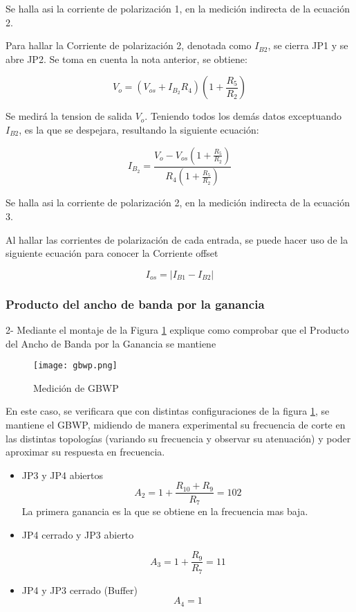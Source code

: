  Se halla asi la corriente de polarización 1, en la medición indirecta de la ecuación 2.

Para hallar la Corriente de polarización 2, denotada como $I_{B2}$, se cierra JP1 y se
abre JP2. Se toma en cuenta la nota anterior, se obtiene:

\begin{equation}
    V_o = \left( V_{os} + I_{B_2} R_4 \right) \left( 1 + \frac{R_5}{R_2} \right)
\end{equation}

Se medirá la tension de salida $V_o$. Teniendo todos los demás datos exceptuando $I_{B2}$, es la que se despejara, resultando la siguiente ecuación:

\begin{equation}
    \boxed{I_{B_2} = \frac{V_o - V_{os} \left( 1 + \frac{R_5}{R_2} \right)}{R_4 \left( 1 + \frac{R_5}{R_2} \right)}}
\end{equation}

Se halla asi la corriente de polarización 2, en la medición indirecta de la ecuación 3.

Al hallar las corrientes de polarización de cada entrada, se puede hacer uso de la siguiente ecuación para conocer la Corriente offset

\begin{equation}
    \boxed{I_{os} = \left| I_{B1} - I_{B2} \right|}
\end{equation}

\subsubsection{Producto del ancho de banda por la ganancia}

2- Mediante el montaje de la Figura \ref{fig:gbwp} explique como comprobar que el Producto del Ancho de Banda por la Ganancia
se mantiene

\begin{figure}[ht]
    \centering
    \texttt{[image: gbwp.png]}
    \caption{Medición de GBWP}
    \label{fig:gbwp}
\end{figure}

En este caso, se verificara que con distintas configuraciones de la figura \ref{fig:gbwp}, se mantiene el GBWP, midiendo de manera experimental su frecuencia de corte en las distintas topologías
(variando su frecuencia y observar su atenuación) y poder aproximar su respuesta en frecuencia.

\begin{itemize}
    \item JP3 y JP4 abiertos
    $$A_2 = 1 + \frac{R_{10} + R_9}{R_7} = 102$$
    La primera ganancia es la que se obtiene en la frecuencia mas baja.
    \item JP4 cerrado y JP3 abierto

    $$A_3 = 1 + \frac{R_9}{R_7} = 11$$

    \item JP4 y JP3 cerrado (Buffer)
    $$A_4=1$$

\end{itemize}

